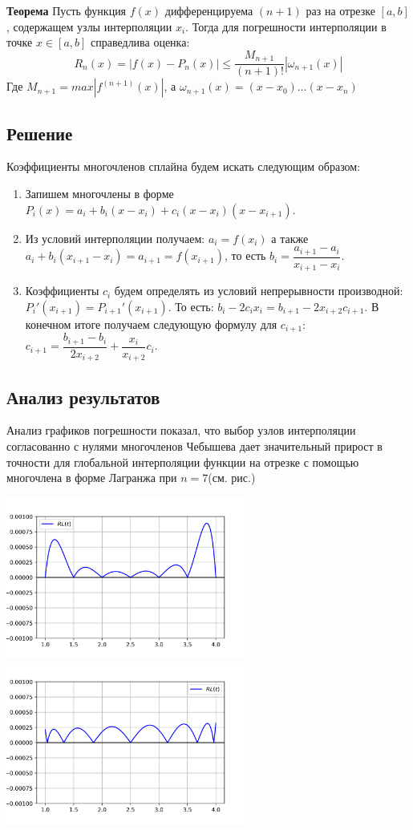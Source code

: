 \textbf{Теорема}{
	Пусть функция $f(x)$ дифференцируема $(n+1)$ раз на отрезке $[a, b]$, содержащем узлы интерполяции $x_i$. Тогда для погрешности интерполяции в точке $x \in [a, b]$ справедлива оценка:
	\[
		R_n(x) = |f(x) - P_n(x)| \leq \dfrac{M_{n+1}}{(n+1)!}|\omega_{n+1}(x)|
	\]
	Где $M_{n+1} = max|f^{(n+1)}(x)|$, а $\omega_{n+1}(x) = (x - x_0)\dots(x - x_n)$
}

\subsection*{Решение}

Коэффициенты многочленов сплайна будем искать следующим образом:

\begin{enumerate}
	\item Запишем многочлены в форме $P_i(x) = a_i + b_i(x - x_i) + c_i(x - x_i)(x - x_{i+1})$.
	\item Из условий интерполяции получаем: $a_i = f(x_i)$ а также $a_i + b_i(x_{i+1} - x_i) = a_{i+1} = f(x_{i+1})$, то есть $b_i = \dfrac{a_{i+1} - a_i}{x_{i+1} - x_i}$.
	\item Коэффициенты $c_i$ будем определять из условий непрерывности производной: $P_i'(x_{i+1}) = P_{i+1}'(x_{i+1})$. То есть: $b_i - 2c_ix_i = b_{i+1} - 2x_{i+2}c_{i+1}$. В конечном итоге получаем следующую формулу для $c_{i+1}$: $c_{i+1} = \dfrac{b_{i+1} - b_i}{2x_{i+2}} + \dfrac{x_i}{x_{i+2}}c_i$.
\end{enumerate}

\subsection*{Анализ результатов}

Анализ графиков погрешности показал, что выбор узлов интерполяции согласованно с нулями многочленов Чебышева дает значительный прирост в точности для глобальной интерполяции функции на отрезке с помощью многочлена в форме Лагранжа при $n = 7$(см. рис.) 

\noindent
\includegraphics[width=8cm]{plot_4.2_err_Lagrange_equal.png}
\includegraphics[width=8cm]{plot_4.2_err_Lagrange_Chebyschev.png}


